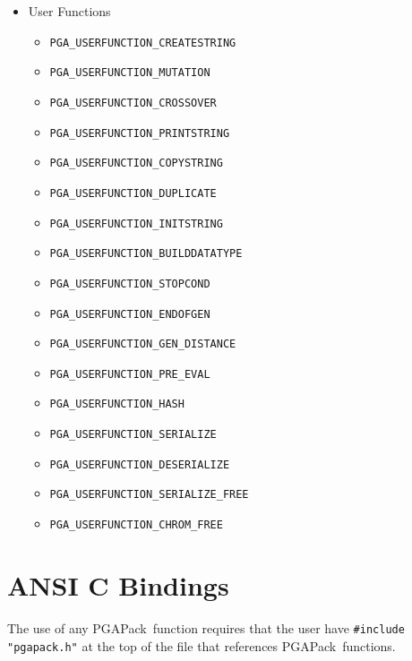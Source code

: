 \documentclass{report}
\newcommand{\pga}{PGAPack}
\begin{document}
\begin{itemize}
\item User Functions
\begin{itemize}
\item \verb+PGA_USERFUNCTION_CREATESTRING+
\item \verb+PGA_USERFUNCTION_MUTATION+
\item \verb+PGA_USERFUNCTION_CROSSOVER+
\item \verb+PGA_USERFUNCTION_PRINTSTRING+
\item \verb+PGA_USERFUNCTION_COPYSTRING+
\item \verb+PGA_USERFUNCTION_DUPLICATE+
\item \verb+PGA_USERFUNCTION_INITSTRING+
\item \verb+PGA_USERFUNCTION_BUILDDATATYPE+
\item \verb+PGA_USERFUNCTION_STOPCOND+
\item \verb+PGA_USERFUNCTION_ENDOFGEN+
\item \verb+PGA_USERFUNCTION_GEN_DISTANCE+
\item \verb+PGA_USERFUNCTION_PRE_EVAL+
\item \verb+PGA_USERFUNCTION_HASH+
\item \verb+PGA_USERFUNCTION_SERIALIZE+
\item \verb+PGA_USERFUNCTION_DESERIALIZE+
\item \verb+PGA_USERFUNCTION_SERIALIZE_FREE+
\item \verb+PGA_USERFUNCTION_CHROM_FREE+
\end{itemize}

\end{itemize}

\section*{ANSI C Bindings}\label{app:bindings-c}

The use of any \pga\ function requires that the user have {\tt \#include
"pgapack.h"} at the top of the file that references \pga\ functions.
\vspace{.5in}
\end{document}
